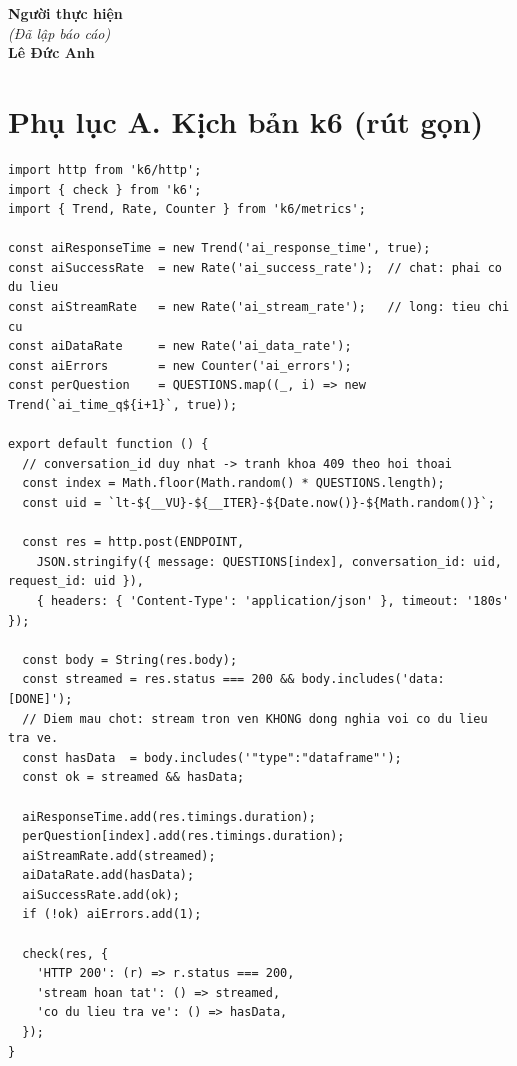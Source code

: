 \documentclass[12pt,a4paper]{article}
\begin{document}
\vspace{1.2cm}
\begin{flushright}
\textbf{Người thực hiện}\\
\textit{(Đã lập báo cáo)}\\[0.8cm]
\textbf{Lê Đức Anh}
\end{flushright}

\clearpage
\section*{Phụ lục A. Kịch bản k6 (rút gọn)}

\begin{lstlisting}[language=JS,caption={Logic phát tải và đo lường của mỗi người dùng ảo}]
import http from 'k6/http';
import { check } from 'k6';
import { Trend, Rate, Counter } from 'k6/metrics';

const aiResponseTime = new Trend('ai_response_time', true);
const aiSuccessRate  = new Rate('ai_success_rate');  // chat: phai co du lieu
const aiStreamRate   = new Rate('ai_stream_rate');   // long: tieu chi cu
const aiDataRate     = new Rate('ai_data_rate');
const aiErrors       = new Counter('ai_errors');
const perQuestion    = QUESTIONS.map((_, i) => new Trend(`ai_time_q${i+1}`, true));

export default function () {
  // conversation_id duy nhat -> tranh khoa 409 theo hoi thoai
  const index = Math.floor(Math.random() * QUESTIONS.length);
  const uid = `lt-${__VU}-${__ITER}-${Date.now()}-${Math.random()}`;

  const res = http.post(ENDPOINT,
    JSON.stringify({ message: QUESTIONS[index], conversation_id: uid, request_id: uid }),
    { headers: { 'Content-Type': 'application/json' }, timeout: '180s' });

  const body = String(res.body);
  const streamed = res.status === 200 && body.includes('data: [DONE]');
  // Diem mau chot: stream tron ven KHONG dong nghia voi co du lieu tra ve.
  const hasData  = body.includes('"type":"dataframe"');
  const ok = streamed && hasData;

  aiResponseTime.add(res.timings.duration);
  perQuestion[index].add(res.timings.duration);
  aiStreamRate.add(streamed);
  aiDataRate.add(hasData);
  aiSuccessRate.add(ok);
  if (!ok) aiErrors.add(1);

  check(res, {
    'HTTP 200': (r) => r.status === 200,
    'stream hoan tat': () => streamed,
    'co du lieu tra ve': () => hasData,
  });
}
\end{lstlisting}
\end{document}
